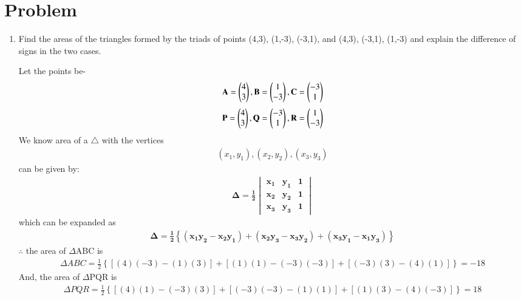 \documentclass[journal,12pt,twocolumn]{IEEEtran}
\renewcommand\thesection{\arabic{section}}
\begin{document}
\renewcommand{\thefigure}{\theenumi}
\renewcommand{\thetable}{\theenumi}

\section{Problem}
\renewcommand{\theequation}{\theenumi}
\begin{enumerate}[label=\thesection.\arabic*.,ref=\thesection.\theenumi]

\item Find the areas of the triangles formed by the triads of points (4,3), (1,-3), (-3,1), and (4,3), (-3,1), (1,-3) and explain the difference of signs in the two cases.

\solution
Let the points be-
\begin{align}
\mathbf{A} = \begin{pmatrix}4\\3\end{pmatrix}, \mathbf{B} =\begin{pmatrix}1\\-3\end{pmatrix}, \mathbf{C} =\begin{pmatrix}-3\\1\end{pmatrix}
\end{align}
\begin{align}
\mathbf{P} =\begin{pmatrix}4\\3\end{pmatrix}, \mathbf{Q} =\begin{pmatrix}-3\\1\end{pmatrix}, \mathbf{R} =\begin{pmatrix}1\\-3\end{pmatrix}   
\end{align}
We know area of a $\triangle$ with the vertices
\begin{align}
 (x_{1},y_{1}),(x_{2},y_{2}),(x_{3},y_{3})   
\end{align}
can be given by:
\begin{align}
\mathbf{\Delta = \frac{1}{2}\begin{vmatrix}
x_{1} & y_{1} & 1\\ 
x_{2}& y_{2} & 1\\ 
x_{3} & y_{3} & 1
\end{vmatrix}}
\end{align}
which can be expanded as
\begin{align}
\mathbf{\Delta =\frac{1}{2}\left \{ (x_{1}y_{2}-x_{2}y_{1})+(x_{2}y_{3}-x_{3}y_{2})+(x_{3}y_{1}-x_{1}y_{3})\right \}}
\end{align}
$\therefore$ the area of $\Delta$ABC is
\begin{align}
\Delta ABC= \frac{1}{2}\left\{[(4)(-3)-(1)(3)]+[(1)(1)-(-3)(-3)]+[(-3)(3)-(4)(1)] \right \}= -18  
\end{align}
And, the area of $\Delta$PQR is
\begin{align}
\Delta PQR= \frac{1}{2}\left \{ [(4)(1)-(-3)(3)]+[(-3)(-3)-(1)(1)]+[(1)(3)-(4)(-3)] \right \} = 18

\end{align}
\end{enumerate}
\end{document}

